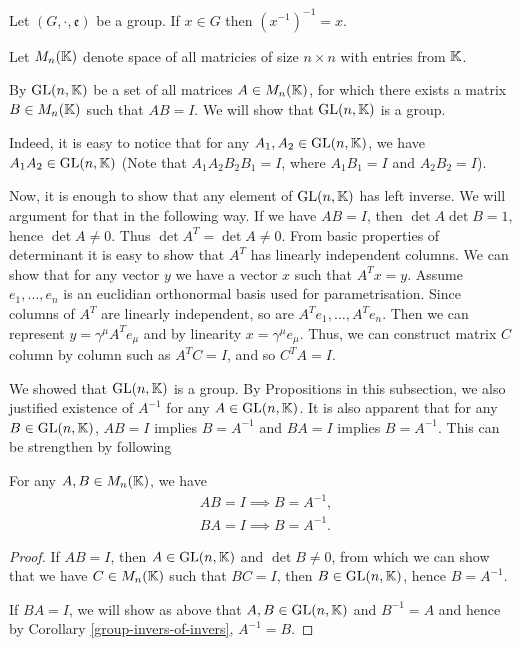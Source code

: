 \documentclass[main.tex]{subfiles}
\begin{document}
\begin{corollary}
\label{group-invers-of-invers}
Let $(G, \cdot, \mathfrak{e})$ be a group. If $x\in G$ then $(x^{-1})^{-1} = x$.
\end{corollary}
Let $M_n(\mathbb{K})$ denote space of all matricies of size $n\times n$ with entries from $\mathbb{K}$.

By $\text{GL}(n, \mathbb{K})$ be a set of all matrices $A \in M_n(\mathbb{K})$, for which there exists a matrix $B\in M_n(\mathbb{K})$ such that $AB = I$. We will show that $\text{GL}(n, \mathbb{K})$ is a group.

Indeed, it is easy to notice that for any $A_1, A_2\in \text{GL}(n, \mathbb{K})$, we have $A_1A_2\in \text{GL}(n, \mathbb{K})$ (Note that $A_1 A_2 B_2 B_1 = I$, where $A_1B_1 = I$ and $A_2B_2 = I$).

Now, it is enough to show that any element of $\text{GL}(n, \mathbb{K})$ has left inverse. We will argument for that in the following way. If we have $AB = I$, then $\det A \det B = 1$, hence $\det A\not = 0$. Thus $\det A^T = \det A \not = 0$. From basic properties of determinant it is easy to show that $A^T$ has linearly independent columns. We can show that for any vector $y$ we have a vector $x$ such that $A^T x = y$. Assume $e_1, \dots, e_n$ is an euclidian orthonormal basis used for parametrisation. Since columns of $A^T$ are linearly independent, so are $A^T e_1, \dots, A^T e_n$. Then we can represent $y = \gamma^\mu A^T e_\mu$ and by linearity $x = \gamma^\mu e_\mu$. Thus, we can construct matrix $C$ column by column such as $A^T C = I$, and so $C^T A = I$.

We showed that $\text{GL}(n, \mathbb{K})$ is a group. By Propositions in this subsection, we also justified existence of $A^{-1}$ for any $A\in \text{GL}(n, \mathbb{K})$. It is also apparent that for any $B\in \text{GL}(n, \mathbb{K})$, $AB = I$ implies $B = A^{-1}$ and $BA = I$ implies $B = A^{-1}$. This can be strengthen by following

\begin{proposition}
For any $A, B \in  M_n(\mathbb{K})$, we have
\begin{align}
& AB = I \implies B = A^{-1},\\
& BA = I \implies B = A^{-1}.
\end{align} 
\end{proposition}
\begin{proof}
If $AB = I$, then $A\in \text{GL}(n, \mathbb{K})$ and $\det B \not = 0$, from which we can show that we have $C\in  M_n(\mathbb{K})$ such that $BC = I$, then $B\in \text{GL}(n, \mathbb{K})$, hence $B = A^{-1}$.

If $BA = I$, we will show as above that $A, B\in \text{GL}(n, \mathbb{K})$ and $B^{-1} = A$ and hence by Corollary \ref{group-invers-of-invers}, $A^{-1} = B$.
\end{proof}
\end{document}
